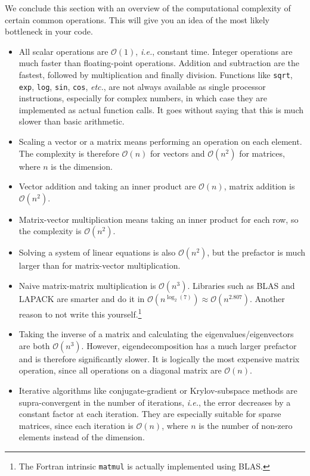 \documentclass[openany,oneside]{report}
\begin{document}
We conclude this section with an overview of the computational complexity of certain common operations.
This will give you an idea of the most likely bottleneck in your code.
\begin{itemize}
  \item All scalar operations are $\mathcal{O}(1)$, \emph{i.e.}, constant time.
    Integer operations are much faster than floating-point operations.
    Addition and subtraction are the fastest, followed by multiplication and finally division.
    Functions like \texttt{sqrt}, \texttt{exp}, \texttt{log}, \texttt{sin}, \texttt{cos}, \emph{etc.}, are not always available as single processor instructions, especially for complex numbers, in which case they are implemented as actual function calls.
    It goes without saying that this is much slower than basic arithmetic.
  \item Scaling a vector or a matrix means performing an operation on each element.
    The complexity is therefore $\mathcal{O}(n)$ for vectors and $\mathcal{O}\left(n^2\right)$ for matrices, where $n$ is the dimension.
  \item Vector addition and taking an inner product are $\mathcal{O}(n)$, matrix addition is $\mathcal{O}\left(n^2\right)$.
  \item Matrix-vector multiplication means taking an inner product for each row, so the complexity is $\mathcal{O}\left(n^2\right)$.
  \item Solving a system of linear equations is also $\mathcal{O}\left(n^2\right)$, but the prefactor is much larger than for matrix-vector multiplication.
  \item Naive matrix-matrix multiplication is $\mathcal{O}\left(n^3\right)$.
    Libraries such as BLAS and LAPACK are smarter and do it in $\mathcal{O}\left(n^{\log_2(7)}\right)\approx\mathcal{O}\left(n^{2.807}\right)$.
    Another reason to not write this yourself.\footnote{The Fortran intrinsic \texttt{matmul} is actually implemented using BLAS.}
  \item Taking the inverse of a matrix and calculating the eigenvalues/eigenvectors are both $\mathcal{O}\left(n^3\right)$.
    However, eigendecomposition has a much larger prefactor and is therefore significantly slower.
    It is logically the most expensive matrix operation, since all operations on a diagonal matrix are $\mathcal{O}(n)$.
  \item Iterative algorithms like conjugate-gradient or Krylov-subspace methods are supra-\linebreak convergent in the number of iterations, \emph{i.e.}, the error decreases by a constant factor at each iteration.
    They are especially suitable for sparse matrices, since each iteration is $\mathcal{O}(n)$, where $n$ is the number of non-zero elements instead of the dimension.
\end{itemize}
\end{document}
